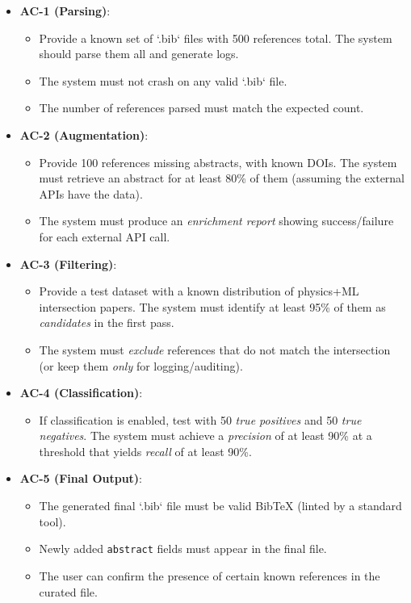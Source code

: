 \documentclass[12pt]{article}
\begin{document}
\begin{itemize}
  \item \textbf{AC-1 (Parsing)}: 
  \begin{itemize}
    \item Provide a known set of `.bib` files with 500 references total. The system should parse them all and generate logs. 
    \item The system must not crash on any valid `.bib` file. 
    \item The number of references parsed must match the expected count.
  \end{itemize}

  \item \textbf{AC-2 (Augmentation)}: 
  \begin{itemize}
    \item Provide 100 references missing abstracts, with known DOIs. The system must retrieve an abstract for at least 80\% of them (assuming the external APIs have the data).
    \item The system must produce an \emph{enrichment report} showing success/failure for each external API call.
  \end{itemize}

  \item \textbf{AC-3 (Filtering)}: 
  \begin{itemize}
    \item Provide a test dataset with a known distribution of physics+ML intersection papers. The system must identify at least 95\% of them as \emph{candidates} in the first pass.
    \item The system must \emph{exclude} references that do not match the intersection (or keep them \emph{only} for logging/auditing).
  \end{itemize}

  \item \textbf{AC-4 (Classification)}:
  \begin{itemize}
    \item If classification is enabled, test with 50 \emph{true positives} and 50 \emph{true negatives}. The system must achieve a \emph{precision} of at least 90\% at a threshold that yields \emph{recall} of at least 90\%.
  \end{itemize}

  \item \textbf{AC-5 (Final Output)}:
  \begin{itemize}
    \item The generated final `.bib` file must be valid BibTeX (linted by a standard tool).
    \item Newly added \texttt{abstract} fields must appear in the final file.
    \item The user can confirm the presence of certain known references in the curated file.
  \end{itemize}
\end{itemize}
\end{document}
